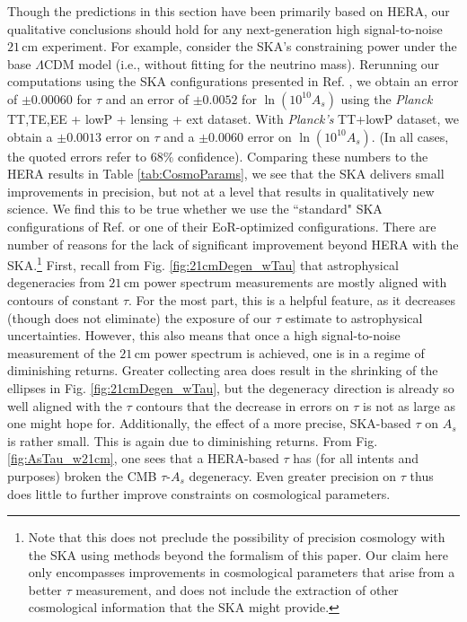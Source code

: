 \documentclass[twocolumn,aps,prd,nofootinbib,showpacs,superscriptaddress]{revtex4-1}
\begin{document}
Though the predictions in this section have been primarily based on HERA, our qualitative conclusions should hold for any next-generation high signal-to-noise $21\,\textrm{cm}$ experiment. For example, consider the SKA's constraining power under the base $\Lambda$CDM model (i.e., without fitting for the neutrino mass). Rerunning our computations using the SKA configurations presented in Ref. \cite{greig_et_al2015b}, we obtain an error of $\pm 0.00060$ for $\tau$ and an error of $\pm 0.0052$ for $\ln (10^{10} A_s)$ using the \emph{Planck} TT,TE,EE + lowP + lensing + ext dataset. With \emph{Planck's} TT+lowP dataset, we obtain a $\pm 0.0013$ error on $\tau$ and a $\pm 0.0060$ error on $\ln (10^{10} A_s)$. (In all cases, the quoted errors refer to $68\%$ confidence). Comparing these numbers to the HERA results in Table \ref{tab:CosmoParams}, we see that the SKA delivers small improvements in precision, but not at a level that results in qualitatively new science.  We find this to be true whether we use the ``standard" SKA configurations of Ref. \cite{greig_et_al2015b} or one of their EoR-optimized configurations. There are number of reasons for the lack of significant improvement beyond HERA with the SKA.\footnote{Note that this does not preclude the possibility of precision cosmology with the SKA using methods beyond the formalism of this paper. Our claim here only encompasses improvements in cosmological parameters that arise from a better $\tau$ measurement, and does not include the extraction of other cosmological information that the SKA might provide.} First, recall from Fig. \ref{fig:21cmDegen_wTau} that astrophysical degeneracies from $21\,\textrm{cm}$ power spectrum measurements are mostly aligned with contours of constant $\tau$. For the most part, this is a helpful feature, as it decreases (though does not eliminate) the exposure of our $\tau$ estimate to astrophysical uncertainties. However, this also means that once a high signal-to-noise measurement of the $21\,\textrm{cm}$ power spectrum is achieved, one is in a regime of diminishing returns. Greater collecting area does result in the shrinking of the ellipses in Fig. \ref{fig:21cmDegen_wTau}, but the degeneracy direction is already so well aligned with the $\tau$ contours that the decrease in errors on $\tau$ is not as large as one might hope for. Additionally, the effect of a more precise, SKA-based $\tau$ on $A_s$ is rather small. This is again due to diminishing returns. From Fig. \ref{fig:AsTau_w21cm}, one sees that a HERA-based $\tau$ has (for all intents and purposes) broken the CMB $\tau$-$A_s$ degeneracy. Even greater precision on $\tau$ thus does little to further improve constraints on cosmological parameters.
\end{document}
